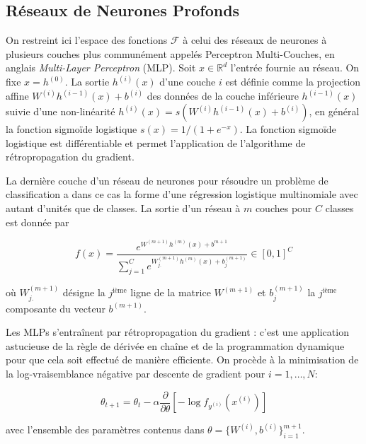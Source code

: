 \subsection{Réseaux de Neurones Profonds}

On restreint ici l'espace des fonctions $\mathcal{F}$ à celui des réseaux de
neurones à plusieurs couches plus communément appelés Perceptron Multi-Couches,
en anglais \textit{Multi-Layer Perceptron} (MLP)\citep{Rumelhart86}. Soit
$x\in\mathbb{R}^d$ l'entrée fournie au réseau. On fixe $x=h^{(0)}$. La sortie
$h^{(i)}(x)$ d'une couche $i$ est définie comme la projection affine
$W^{(i)}h^{(i-1)}(x) + b^{(i)}$ des données de la couche inférieure $h^{(i-1)}(x)$
suivie d'une non-linéarité $h^{(i)}(x)= s(W^{(i)}h^{(i-1)}(x) + b^{(i)})$, en
général la fonction sigmoïde logistique $s(x)=1/(1+e^{-x})$. La fonction sigmoïde logistique est différentiable et
permet l'application de l'algorithme de rétropropagation du gradient. 

La dernière couche d'un réseau de neurones pour résoudre un problème de
classification a dans ce cas la forme d'une régression logistique multinomiale
avec autant d'unités que de classes. La sortie d'un réseau à $m$ couches pour
$C$ classes est donnée par

\begin{equation}
\label{eq:softmax}
f(x) = \frac{e^{W^{(m+1)} h^{(m)}(x) + b^{m+1}}}{\sum_{j=1}^C e^{W^{(m+1)}_{j.} h^{(m)}(x) + b^{(m+1)}_{j} }} \in [0,1]^{C}
\end{equation}

où $W_{j.}^{(m+1)}$ désigne la $j^\textrm{ième}$ ligne de la matrice $W^{(m+1)}$
et $b_{j}^{(m+1)}$ la $j^\textrm{ième}$ composante du vecteur $b^{(m+1)}$.

Les MLPs s'entraînent par rétropropagation du gradient \citep{Rumelhart86b}:
c'est une application astucieuse de la règle de dérivée en chaîne et de la
programmation dynamique pour que cela soit effectué de manière efficiente. On
procède à la minimisation de la log-vraisemblance négative par descente de
gradient pour $i=1,\dots,N$:

\begin{equation}
\theta_{t+1} = \theta_{t} - \alpha \dfrac{\partial}{\partial\theta} [-\log f_{y^{(i)}}(x^{(i)})]
\end{equation}

avec l'ensemble des paramètres contenus dans $\theta=\lbrace W^{(i)},b^{(i)}\rbrace_{i=1}^{m+1}$.




